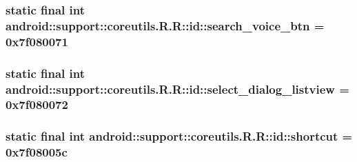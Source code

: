 \hypertarget{classandroid_1_1support_1_1coreutils_1_1_r_1_1id_0e1e135a33607bbc008f18fa938cc20a}{
\subsubsection[{search\_\-voice\_\-btn}]{\setlength{\rightskip}{0pt plus 5cm}static final int android::support::coreutils.R.R::id::search\_\-voice\_\-btn = 0x7f080071}}
\label{classandroid_1_1support_1_1coreutils_1_1_r_1_1id_0e1e135a33607bbc008f18fa938cc20a}


\hypertarget{classandroid_1_1support_1_1coreutils_1_1_r_1_1id_a09c3aedd638b48e4d73488eee931726}{
\subsubsection[{select\_\-dialog\_\-listview}]{\setlength{\rightskip}{0pt plus 5cm}static final int android::support::coreutils.R.R::id::select\_\-dialog\_\-listview = 0x7f080072}}
\label{classandroid_1_1support_1_1coreutils_1_1_r_1_1id_a09c3aedd638b48e4d73488eee931726}


\hypertarget{classandroid_1_1support_1_1coreutils_1_1_r_1_1id_b557ff65520d6204a1da1d2df1d72101}{
\subsubsection[{shortcut}]{\setlength{\rightskip}{0pt plus 5cm}static final int android::support::coreutils.R.R::id::shortcut = 0x7f08005c}}
\label{classandroid_1_1support_1_1coreutils_1_1_r_1_1id_b557ff65520d6204a1da1d2df1d72101}


